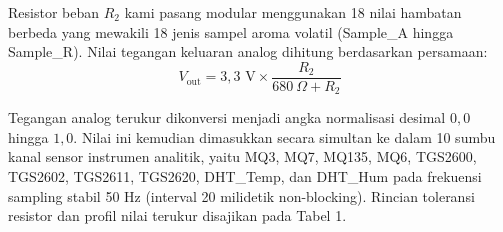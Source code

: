 \documentclass[12pt,a4paper]{article}
\begin{document}
	Resistor beban $R_2$ kami pasang modular menggunakan 18 nilai hambatan berbeda yang mewakili 18 jenis sampel aroma volatil (Sample\_A hingga Sample\_R). Nilai tegangan keluaran analog dihitung berdasarkan persamaan:
	\begin{equation}
		V_{\text{out}} = 3,3\text{ V} \times \frac{R_2}{680\ \Omega + R_2}
	\end{equation}
	
	Tegangan analog terukur dikonversi menjadi angka normalisasi desimal $0,0$ hingga $1,0$. Nilai ini kemudian dimasukkan secara simultan ke dalam 10 sumbu kanal sensor instrumen analitik, yaitu MQ3, MQ7, MQ135, MQ6, TGS2600, TGS2602, TGS2611, TGS2620, DHT\_Temp, dan DHT\_Hum pada frekuensi sampling stabil 50 Hz (interval 20 milidetik non-blocking). Rincian toleransi resistor dan profil nilai terukur disajikan pada Tabel 1.
	
\end{document}
